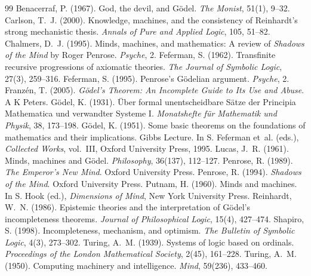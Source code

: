 \documentclass{situationist-preprint}
\begin{document}
\begin{thebibliography}{99}\small
{} Benacerraf, P. (1967). God, the devil, and G\"odel. \emph{The Monist}, 51(1), 9--32.
 Carlson, T.~J. (2000). Knowledge, machines, and the consistency of Reinhardt's strong mechanistic thesis. \emph{Annals of Pure and Applied Logic}, 105, 51--82.
 Chalmers, D.~J. (1995). Minds, machines, and mathematics: A review of \emph{Shadows of the Mind} by Roger Penrose. \emph{Psyche}, 2.
 Feferman, S. (1962). Transfinite recursive progressions of axiomatic theories. \emph{The Journal of Symbolic Logic}, 27(3), 259--316.
 Feferman, S. (1995). Penrose's G\"odelian argument. \emph{Psyche}, 2.
 Franz\'en, T. (2005). \emph{G\"odel's Theorem: An Incomplete Guide to Its Use and Abuse}. A K Peters.
 G\"odel, K. (1931). \"Uber formal unentscheidbare S\"atze der Principia Mathematica und verwandter Systeme I. \emph{Monatshefte f\"ur Mathematik und Physik}, 38, 173--198.
 G\"odel, K. (1951). Some basic theorems on the foundations of mathematics and their implications. Gibbs Lecture. In S. Feferman et~al. (eds.), \emph{Collected Works}, vol.~III, Oxford University Press, 1995.
 Lucas, J.~R. (1961). Minds, machines and G\"odel. \emph{Philosophy}, 36(137), 112--127.
 Penrose, R. (1989). \emph{The Emperor's New Mind}. Oxford University Press.
 Penrose, R. (1994). \emph{Shadows of the Mind}. Oxford University Press.
 Putnam, H. (1960). Minds and machines. In S. Hook (ed.), \emph{Dimensions of Mind}, New York University Press.
 Reinhardt, W.~N. (1986). Epistemic theories and the interpretation of G\"odel's incompleteness theorems. \emph{Journal of Philosophical Logic}, 15(4), 427--474.
 Shapiro, S. (1998). Incompleteness, mechanism, and optimism. \emph{The Bulletin of Symbolic Logic}, 4(3), 273--302.
 Turing, A.~M. (1939). Systems of logic based on ordinals. \emph{Proceedings of the London Mathematical Society}, 2(45), 161--228.
 Turing, A.~M. (1950). Computing machinery and intelligence. \emph{Mind}, 59(236), 433--460.
\end{thebibliography}
\end{document}
